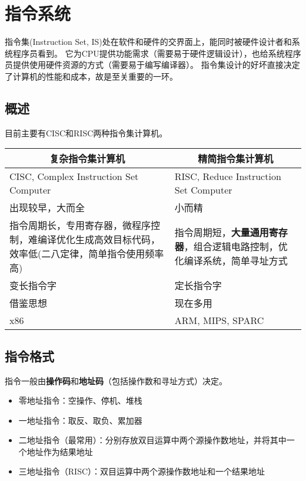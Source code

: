 
\section{指令系统}
指令集(Instruction Set, IS)处在软件和硬件的交界面上，能同时被硬件设计者和系统程序员看到。
它为CPU提供功能需求（需要易于硬件逻辑设计），也给系统程序员提供使用硬件资源的方式（需要易于编写编译器）。
指令集设计的好坏直接决定了计算机的性能和成本，故是至关重要的一环。

\subsection{概述}
目前主要有CISC和RISC两种指令集计算机。
\begin{center}
\begin{tabular}{|m{8cm}|m{8cm}|}
\hline
\multicolumn{1}{|c|}{复杂指令集计算机} & \multicolumn{1}{c|}{精简指令集计算机} \\\hline
CISC, Complex Instruction Set Computer & RISC, Reduce Instruction Set Computer\\\hline
出现较早，大而全 & 小而精 \\\hline
指令周期长，专用寄存器，微程序控制，难编译优化生成高效目标代码，效率低(二八定律，简单指令使用频率高) & 指令周期短，\textbf{大量通用寄存器}，组合逻辑电路控制，优化编译系统，简单寻址方式\\\hline
变长指令字 & 定长指令字 \\\hline
借鉴思想 & 现在多用 \\\hline
x86 & ARM, MIPS, SPARC \\\hline
\end{tabular}
\end{center}

\subsection{指令格式}
指令一般由\textbf{操作码}和\textbf{地址码}（包括操作数和寻址方式）决定。
\begin{itemize}
	\item 零地址指令：空操作、停机、堆栈
	\item 一地址指令：取反、取负、累加器
	\item 二地址指令（最常用）：分别存放双目运算中两个源操作数地址，并将其中一个地址作为结果地址
	\item 三地址指令（RISC）：双目运算中两个源操作数地址和一个结果地址
\end{itemize}


